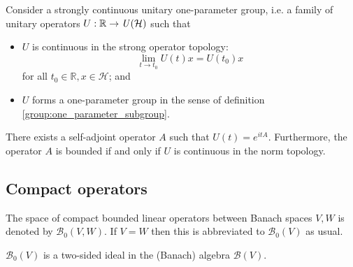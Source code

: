     \begin{theorem}[Stone]\label{operator:stone}
        Consider a strongly continuous unitary one-parameter group, i.e. a family of unitary operators $U:\mathbb{R}\rightarrow\text{\emph{U}}(\mathcal{H})$ such that
        \begin{itemize}
            \item $U$ is continuous in the strong operator topology: \[\lim_{t\rightarrow t_0}U(t)x=U(t_0)x\] for all $t_0\in\mathbb{R}, x\in\mathcal{H}$; and
            \item $U$ forms a one-parameter group in the sense of definition \ref{group:one_parameter_subgroup}.
        \end{itemize}
            There exists a self-adjoint operator $A$ such that $U(t) = e^{itA}$. Furthermore, the operator $A$ is bounded if and only if $U$ is continuous in the norm topology.
    \end{theorem}

\subsection{Compact operators}



    \begin{notation}
        The space of compact bounded linear operators between Banach spaces $V, W$ is denoted by $\mathcal{B}_0(V, W)$. If $V=W$ then this is abbreviated to $\mathcal{B}_0(V)$ as usual.
    \end{notation}
    \begin{property}
        $\mathcal{B}_0(V)$ is a two-sided ideal in the (Banach) algebra $\mathcal{B}(V)$.
    \end{property}

